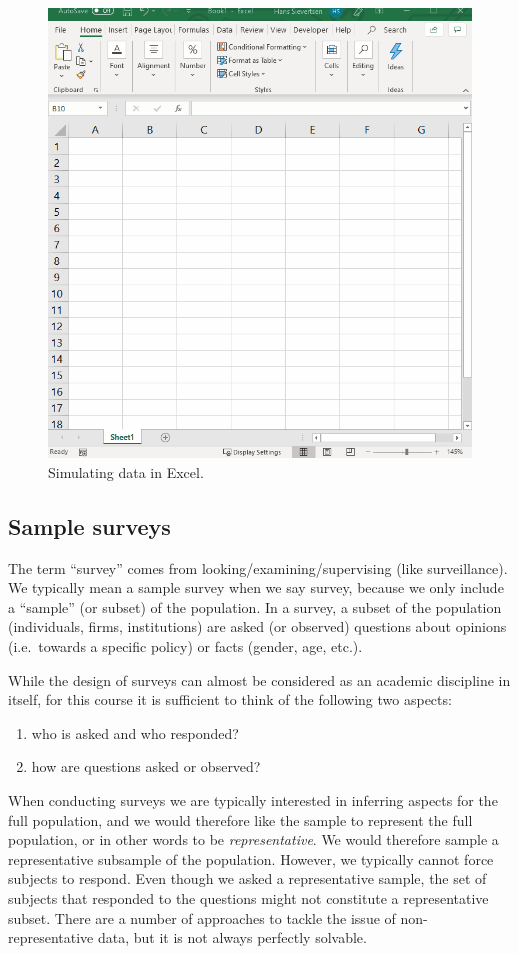 \documentclass[]{book}
\providecommand{\tightlist}{%
  \setlength{\itemsep}{0pt}\setlength{\parskip}{0pt}}
\begin{document}
\begin{figure}

{\centering \includegraphics[width=0.6\linewidth]{_resources/chapter_sources/simulate} 

}

\caption{Simulating data in Excel.}\label{fig:source0}
\end{figure}

\hypertarget{sample-surveys}{%
\subsection{Sample surveys}\label{sample-surveys}}

The term ``survey'' comes from looking/examining/supervising (like surveillance). We typically mean a sample survey when we say survey, because we only include a ``sample'' (or subset) of the population. In a survey, a subset of the population (individuals, firms, institutions) are asked (or observed) questions about opinions (i.e.~towards a specific policy) or facts (gender, age, etc.).

While the design of surveys can almost be considered as an academic discipline in itself, for this course it is sufficient to think of the following two aspects:

\begin{enumerate}
\def\labelenumi{\arabic{enumi}.}
\tightlist
\item
  who is asked and who responded?
\item
  how are questions asked or observed?
\end{enumerate}

When conducting surveys we are typically interested in inferring aspects for the full population, and we would therefore like the sample to represent the full population, or in other words to be \emph{representative}. We would therefore sample a representative subsample of the population. However, we typically cannot force subjects to respond. Even though we asked a representative sample, the set of subjects that responded to the questions might not constitute a representative subset. There are a number of approaches to tackle the issue of non-representative data, but it is not always perfectly solvable.
\end{document}
